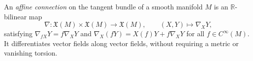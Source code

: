 
An \emph{affine connection} on the tangent bundle of a smooth manifold $M$ is an $\mathbb R$-bilinear map
\[
\nabla:\mathfrak X(M)\times\mathfrak X(M)\to\mathfrak X(M),\qquad(X,Y)\mapsto\nabla_XY,
\]
satisfying $\nabla_{fX}Y=f\nabla_XY$ and $\nabla_X(fY)=X(f)Y+f\nabla_XY$ for all $f\in C^\infty(M)$. It differentiates vector fields along vector fields, without requiring a metric or vanishing torsion.
